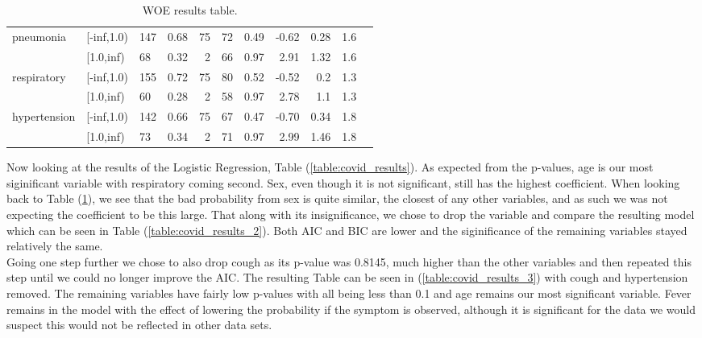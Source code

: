 \begin{table}[H]
\begin{tabular}{lllrrrrrrrr}
		\midrule
		 pneumonia &  [-inf,1.0) &    147 &         0.68 &    75 &   72 &     0.49 & -0.62 &    0.28 &       1.6 \\
  		&   [1.0,inf) &     68 &         0.32 &     2 &   66 &     0.97 &  2.91 &    1.32 &       1.6 \\
		\midrule
		respiratory  &  [-inf,1.0) &    155 &         0.72 &    75 &   80 &     0.52 & -0.52 &     0.2 &       1.3 \\
   		&   [1.0,inf) &     60 &         0.28 &     2 &   58 &     0.97 &  2.78 &     1.1 &       1.3 \\
		\midrule
		hypertension &  [-inf,1.0) &    142 &         0.66 &    75 &   67 &     0.47 & -0.70 &    0.34 &       1.8 \\
  		&   [1.0,inf) &     73 &         0.34 &     2 &   71 &     0.97 &  2.99 &    1.46 &       1.8 \\
		\bottomrule
	\end{tabular}
	\caption{WOE results table. \label{table:covid_woe}}
\end{table}

Now looking at the results of the Logistic Regression, Table (\ref{table:covid_results}). As expected from the p-values, age is our most siginificant variable with respiratory coming second. Sex, even though it is not significant, still has the highest coefficient. When looking back to Table (\ref{table:covid_woe}), we see that the bad probability from sex is quite similar, the closest of any other variables, and as such we was not expecting the coefficient to be this large. That along with its insignificance, we chose to drop the variable and compare the resulting model which can be seen in Table (\ref{table:covid_results_2}). Both AIC and BIC are lower and the siginificance of the remaining variables stayed relatively the same. \\

Going one step further we chose to also drop cough as its p-value was 0.8145, much higher than the other variables and then repeated this step until we could no longer improve the AIC. The resulting Table can be seen in (\ref{table:covid_results_3}) with cough and hypertension removed. The remaining variables have fairly low p-values with all being less than 0.1 and age remains our most significant variable. Fever remains in the model with the effect of lowering the probability if the symptom is observed, although it is significant for the data we would suspect this would not be reflected in other data sets. \\

